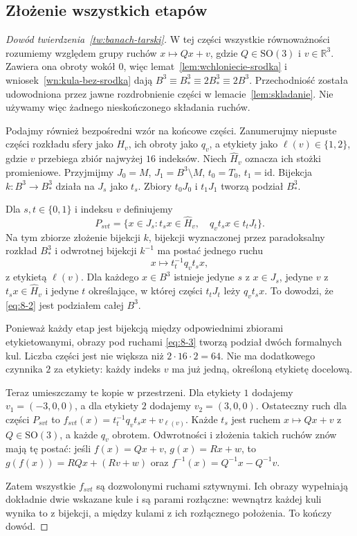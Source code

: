\subsection{Złożenie wszystkich etapów}
\begin{proof}[Dowód twierdzenia~\ref{tw:banach-tarski}]
W tej części wszystkie równoważności rozumiemy względem grupy ruchów $x\mapsto Qx+v$, gdzie $Q\in\mathrm{SO}(3)$ i $v\in\mathbb R^3$. Zawiera ona obroty wokół $0$, więc lemat~\ref{lem:wchloniecie-srodka} i wniosek~\ref{wn:kula-bez-srodka} dają $B^3\equiv B^3_*\equiv2B^3_*\equiv2B^3$. Przechodniość została udowodniona przez jawne rozdrobnienie części w lemacie~\ref{lem:skladanie}. Nie używamy więc żadnego nieskończonego składania ruchów.

Podajmy również bezpośredni wzór na końcowe części. Zanumerujmy niepuste części rozkładu sfery jako $H_v$, ich obroty jako $q_v$, a etykiety jako $\ell(v)\in\{1,2\}$, gdzie $v$ przebiega zbiór najwyżej $16$ indeksów. Niech $\widehat H_v$ oznacza ich stożki promieniowe. Przyjmijmy $J_0=M$, $J_1=B^3\setminus M$, $t_0=T_0$, $t_1=\mathrm{id}$. Bijekcja $k:B^3\to B^3_*$ działa na $J_s$ jako $t_s$. Zbiory $t_0J_0$ i $t_1J_1$ tworzą podział $B^3_*$.

Dla $s,t\in\{0,1\}$ i indeksu $v$ definiujemy
\begin{equation}\label{eq:8-2}
 P_{svt}=\{x\in J_s:t_sx\in\widehat H_v,\quad q_vt_sx\in t_tJ_t\}.
\end{equation}
Na tym zbiorze złożenie bijekcji $k$, bijekcji wyznaczonej przez paradoksalny rozkład $B^3_*$ i odwrotnej bijekcji $k^{-1}$ ma postać jednego ruchu
\begin{equation}\label{eq:8-3}
 x\longmapsto t_t^{-1}q_vt_sx,
\end{equation}
z etykietą $\ell(v)$. Dla każdego $x\in B^3$ istnieje jedyne $s$ z $x\in J_s$, jedyne $v$ z $t_sx\in\widehat H_v$ i jedyne $t$ określające, w której części $t_tJ_t$ leży $q_vt_sx$. To dowodzi, że \eqref{eq:8-2} jest podziałem całej $B^3$.

Ponieważ każdy etap jest bijekcją między odpowiednimi zbiorami etykietowanymi, obrazy pod ruchami \eqref{eq:8-3} tworzą podział dwóch formalnych kul. Liczba części jest nie większa niż $2\cdot16\cdot2=64$. Nie ma dodatkowego czynnika $2$ za etykiety: każdy indeks $v$ ma już jedną, określoną etykietę docelową.

Teraz umieszczamy te kopie w przestrzeni. Dla etykiety $1$ dodajemy $v_1=(-3,0,0)$, a dla etykiety $2$ dodajemy $v_2=(3,0,0)$. Ostateczny ruch dla części $P_{svt}$ to $f_{svt}(x)=t_t^{-1}q_vt_sx+v_{\ell(v)}$. Każde $t_s$ jest ruchem $x\mapsto Qx+v$ z $Q\in\mathrm{SO}(3)$, a każde $q_v$ obrotem. Odwrotności i złożenia takich ruchów znów mają tę postać: jeśli $f(x)=Qx+v$, $g(x)=Rx+w$, to $g(f(x))=RQx+(Rv+w)$ oraz $f^{-1}(x)=Q^{-1}x-Q^{-1}v$.

Zatem wszystkie $f_{svt}$ są dozwolonymi ruchami sztywnymi. Ich obrazy wypełniają dokładnie dwie wskazane kule i są parami rozłączne: wewnątrz każdej kuli wynika to z bijekcji, a między kulami z ich rozłącznego położenia. To kończy dowód.
\end{proof}

